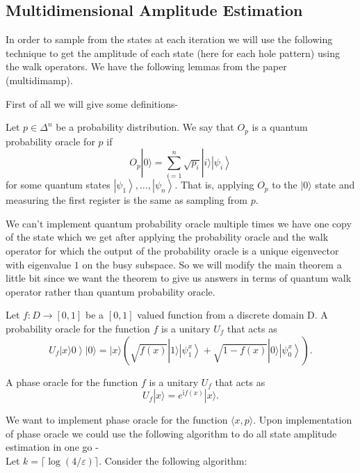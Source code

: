 \begin{flushleft}
	\subsection{Multidimensional Amplitude Estimation}
	In order to sample from the states at each iteration we will use the following technique to get the amplitude of each state (here for each hole pattern) using the walk operators. We have the following lemmas  from the paper (multidimamp).
	\begin{flushleft}
	First of all we will give some definitions-
	\begin{definition}
		  Let $p \in \Delta^n$ be a probability distribution. We say that $O_p$ is a quantum probability oracle for $p$ if
		$$
		O_p|0\rangle=\sum_{i=1}^n \sqrt{p_i}|i\rangle\left|\psi_i\right\rangle
		$$
		for some quantum states $\left|\psi_1\right\rangle, \ldots,\left|\psi_n\right\rangle$. That is, applying $O_p$ to the $|0\rangle$ state and measuring the first register is the same as sampling from $p$.
	\end{definition}
 We can't implement quantum probability oracle multiple times we have one copy of the state which we get after applying the probability oracle and the walk operator for which the output of the probability oracle is a unique eigenvector with eigenvalue $1$ on the busy subspace.	
 So we will modify the main theorem a little bit since we want the theorem to give us answers in terms of quantum walk operator rather than quantum probability oracle.\\
 \begin{definition}
 	Let $f: D \rightarrow[0,1]$ be a $[0,1]$ valued function from a discrete domain D. A probability oracle for the function $f$ is a unitary $U_f$ that acts as
 	$$
 	\left.U_f|x\rangle 0\right\rangle|0\rangle=|x\rangle\left(\sqrt{f(x)}|1\rangle\left|\psi_1^x\right\rangle+\sqrt{1-f(x)}|0\rangle\left|\psi_0^x\right\rangle\right) .
 	$$
 \end{definition}
\begin{definition}
	A phase oracle for the function $f$ is a unitary $U_f$ that acts as
	$$
	U_f|x\rangle=e^{\mathrm{i} f(x)}|x\rangle .
	$$
\end{definition}
We want to implement phase oracle for the function $\langle x,p\rangle$. Upon implementation of phase oracle we could use the following algorithm to do all state amplitude estimation in one go -\\
 Let $k=\lceil\log (4 / \varepsilon)\rceil$. Consider the following algorithm:\\
 \begin{enumerate}
 	

\end{enumerate}
\end{flushleft}
\end{flushleft}

